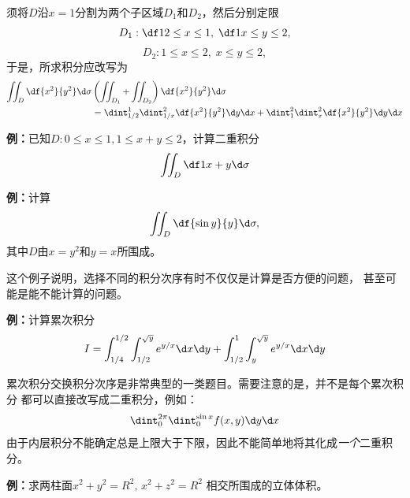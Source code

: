 须将$D$沿$x=1$分割为两个子区域$D_1$和$D_2$，然后分别定限
$$D_1:\df12\leq x\leq 1,\;\df1x\leq y\leq 2,$$
$$D_2:1\leq x\leq 2,\;x\leq y\leq 2,$$
于是，所求积分应改写为
\begin{align*}
	\iint_D\df{x^2}{y^2}\d\sigma&
	\left(\iint_{D_1}+\iint_{D_2}\right)\df{x^2}{y^2}\d\sigma\\
	&=\dint_{1/2}^1\dint_{1/x}^2\df{x^2}{y^2}\d y\d x
	+\dint_1^2\dint_x^2\df{x^2}{y^2}\d y\d x
\end{align*}

{\bf 例：}已知$D:0\leq x\leq 1,1\leq x+y\leq 2$，计算二重积分
$$\iint_D\df1{x+y}\d\sigma$$

{\bf 例：}计算
$$\iint_D\df{\sin y}{y}\d\sigma,$$
其中$D$由$x=y^2$和$y=x$所围成。

这个例子说明，选择不同的积分次序有时不仅仅是计算是否方便的问题，
甚至可能是能不能计算的问题。

{\bf 例：}计算累次积分
$$I=\int_{1/4}^{1/2}\int_{1/2}^{\sqrt y}e^{y/x}\d x\d y+
\int_{1/2}^1\int_y^{\sqrt y}e^{y/x}\d x\d y$$

累次积分交换积分次序是非常典型的一类题目。需要注意的是，并不是每个累次积分
都可以直接改写成二重积分，例如：
$$\dint_0^{2\pi}\dint_0^{\sin x}f(x,y)\d y\d x$$
由于内层积分不能确定总是上限大于下限，因此不能简单地将其化成{\it 一个}二重积分。

{\bf 例：}求两柱面$x^2+y^2=R^2,\, x^2+z^2=R^2$
相交所围成的立体体积。

\begin{center}
\end{center}


